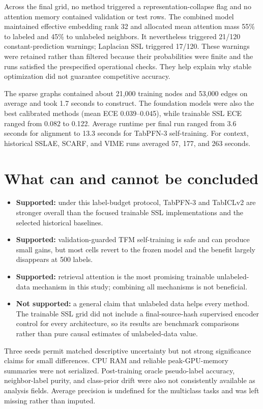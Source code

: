 \documentclass[10pt]{article}
\begin{document}
Across the final grid, no method triggered a representation-collapse flag and
no attention memory contained validation or test rows. The combined model
maintained effective embedding rank 32 and allocated mean attention mass 55\%
to labeled and 45\% to unlabeled neighbors. It nevertheless triggered 21/120
constant-prediction warnings; Laplacian SSL triggered 17/120. These warnings
were retained rather than filtered because their probabilities were finite and
the runs satisfied the prespecified operational checks. They help explain why
stable optimization did not guarantee competitive accuracy.

The sparse graphs contained about 21,000 training nodes and 53,000 edges on
average and took 1.7 seconds to construct. The foundation models were also the
best calibrated methods (mean ECE 0.039--0.045), while trainable SSL ECE ranged
from 0.082 to 0.122. Average runtime per final run ranged from 3.6 seconds for
alignment to 13.3 seconds for TabPFN-3 self-training. For context, historical
SSLAE, SCARF, and VIME runs averaged 57, 177, and 263 seconds.

\section{What can and cannot be concluded}

\begin{itemize}
\item \textbf{Supported:} under this label-budget protocol, TabPFN-3 and
TabICLv2 are stronger overall than the focused trainable SSL implementations
and the selected historical baselines.
\item \textbf{Supported:} validation-guarded TFM self-training is safe and can
produce small gains, but most cells revert to the frozen model and the benefit
largely disappears at 500 labels.
\item \textbf{Supported:} retrieval attention is the most promising trainable
unlabeled-data mechanism in this study; combining all mechanisms is not
beneficial.
\item \textbf{Not supported:} a general claim that unlabeled data helps every
method. The trainable SSL grid did not include a final-source-hash supervised
encoder control for every architecture, so its results are benchmark
comparisons rather than pure causal estimates of unlabeled-data value.
\end{itemize}

Three seeds permit matched descriptive uncertainty but not strong significance
claims for small differences. CPU RAM and reliable peak-GPU-memory summaries
were not serialized. Post-training oracle pseudo-label accuracy,
neighbor-label purity, and class-prior drift were also not consistently
available as analysis fields. Average precision is undefined for the
multiclass tasks and was left missing rather than imputed.
\end{document}

